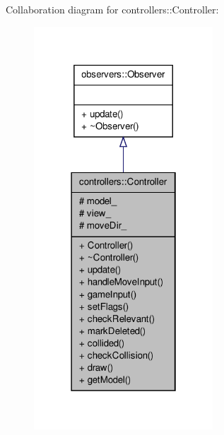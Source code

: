 \-Collaboration diagram for controllers\-:\-:\-Controller\-:
\nopagebreak
\begin{figure}[H]
\begin{center}
\leavevmode
\includegraphics[width=190pt]{d2/dde/classcontrollers_1_1Controller__coll__graph}
\end{center}
\end{figure}
